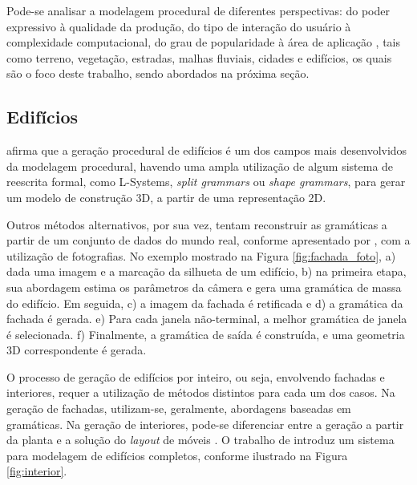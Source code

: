 Pode-se analisar a modelagem procedural de diferentes perspectivas: do poder expressivo à qualidade da produção, do tipo de interação do usuário à complexidade computacional, do grau de popularidade à área de aplicação \cite{smelik2014}, tais como terreno, vegetação, estradas, malhas fluviais, cidades e edifícios, os quais são o foco deste trabalho, sendo abordados na próxima seção.

\subsection{Edifícios}
\label{sec:edificios}

 afirma que a geração procedural de edifícios é um dos campos mais desenvolvidos da modelagem procedural, havendo uma ampla utilização de algum sistema de reescrita formal, como \gls{L-Systems}, \textit{split grammars} ou \textit{shape grammars}, para gerar um modelo de construção 3D, a partir de uma representação 2D.

Outros métodos alternativos, por sua vez, tentam reconstruir as gramáticas a partir de um conjunto de dados do mundo real, conforme apresentado por , com a utilização de fotografias. No exemplo mostrado na Figura \ref{fig:fachada_foto}, a) dada uma imagem e a marcação da silhueta de um edifício, b) na primeira etapa, sua abordagem estima os parâmetros da câmera e gera uma gramática de massa do edifício. Em seguida, c) a imagem da fachada é retificada e d) a gramática da fachada é gerada. e) Para cada janela não-terminal, a melhor gramática de janela é selecionada. f) Finalmente, a gramática de saída é construída, e uma geometria 3D correspondente é gerada.

\begin{figure}[h!]
	\centering
	\captionsetup{width=15cm}
	{}	
\end{figure}

O processo de geração de edifícios por inteiro, ou seja, envolvendo fachadas e interiores, requer a utilização de métodos distintos para cada um dos casos. Na geração de fachadas, utilizam-se, geralmente, abordagens baseadas em gramáticas. Na geração de interiores, pode-se diferenciar entre a geração a partir da planta e a solução do \textit{layout} de móveis \cite{smelik2014}. O trabalho de  introduz um sistema para modelagem de edifícios completos, conforme ilustrado na Figura \ref{fig:interior}.


